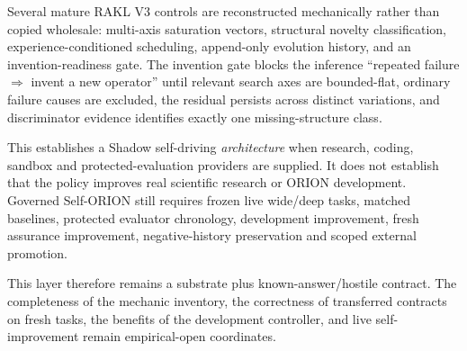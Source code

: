 Several mature RAKL V3 controls are reconstructed mechanically rather than copied wholesale: multi-axis saturation vectors, structural novelty classification, experience-conditioned scheduling, append-only evolution history, and an invention-readiness gate.  The invention gate blocks the inference ``repeated failure $\Rightarrow$ invent a new operator'' until relevant search axes are bounded-flat, ordinary failure causes are excluded, the residual persists across distinct variations, and discriminator evidence identifies exactly one missing-structure class.

This establishes a Shadow self-driving \emph{architecture} when research, coding, sandbox and protected-evaluation providers are supplied.  It does not establish that the policy improves real scientific research or ORION development.  Governed Self-ORION still requires frozen live wide/deep tasks, matched baselines, protected evaluator chronology, development improvement, fresh assurance improvement, negative-history preservation and scoped external promotion.

This layer therefore remains a substrate plus known-answer/hostile contract.  The completeness of the mechanic inventory, the correctness of transferred contracts on fresh tasks, the benefits of the development controller, and live self-improvement remain empirical-open coordinates.

